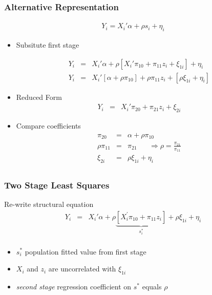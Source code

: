 \documentclass[pdftex]{beamer}
\begin{document}

\begin{frame}
\frametitle{Alternative Representation}


\[\begin{array}{cc}
   Y_{i} =  X_{i}' \alpha + \rho s_{i}+\eta_{i}

    \end{array}
\]

\begin{itemize}
\item Subsitute first stage

\begin{eqnarray*}
   Y_{i} &=& X_{i}' \alpha+ \rho\left[X_{i}'\pi_{10}+\pi_{11}z_{i}+ \xi_{1i}\right]+\eta_{i}\\
   Y_{i} &=&  X_{i}'\left[\alpha+ \rho \pi_{10}\right]+\rho \pi_{11}z_{i}+\left[\rho \xi_{1i}+\eta_{i}\right]
\end{eqnarray*}
   \item Reduced Form
\begin{eqnarray*}
   Y_{i}   &=&  X_{i}'\pi_{20}+\pi_{21}z_{i}+ \xi_{2i}
\end{eqnarray*}
\item Compare coefficients
 \begin{eqnarray*}
   \pi_{20}&=& \alpha+ \rho\pi_{10}\\
   \rho\pi_{11}&=& \pi_{21} \;\;\;\;\;\; \Rightarrow \rho=\frac{\pi_{21}}{\pi_{11}}\\
   \xi_{2i}&=& \rho\xi_{1i} + \eta_{i}\\
\end{eqnarray*}



\end{itemize}
\end{frame}



\begin{frame}
\frametitle{Two Stage Least Squares}

Re-write structural equation
\begin{eqnarray*}
 Y_{i} &=& X_{i}' \alpha+ \rho\underbrace{\left[X_{i}^{'}\pi_{10}+\pi_{11}z_{i}\right]}_{s^*_i}+\rho\xi_{1i}+\eta_{i} \\
\end{eqnarray*}

\begin{itemize}
\item $s^*_i$ population fitted value  from first stage
\item $X_{i}$ and $z_{i}$ are uncorrelated with $\xi_{1i}$
\item \emph{second stage} regression coefficient on $s^{*}$ equals $\rho$

\end {itemize}
\end{frame}
\end{document}
